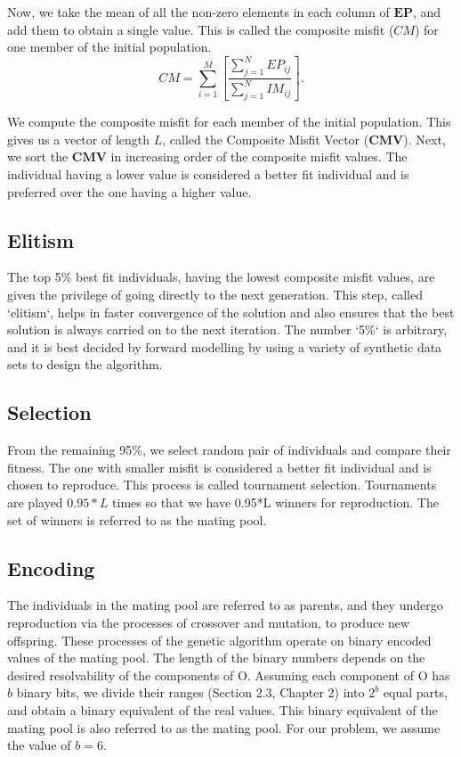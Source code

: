 Now, we take the mean of all the non-zero elements in each column of $\bm{EP}$, and add them to obtain a single value. This is called the composite misfit ($CM$) for one member of the initial population.
\begin{equation} \label{23}
CM = \displaystyle \sum_{i=1}^{M}\left[ \frac{\displaystyle \sum_{j=1}^{N}EP_{ij}}{\displaystyle \sum_{j=1}^{N}IM_{ij}}\right].
\end{equation}

We compute the composite misfit for each member of the initial population. This gives us a vector of length $L$, called the Composite Misfit Vector ($\bm{CMV}$). Next, we sort the $\bm{CMV}$ in increasing order of the composite misfit values. The individual having a lower value is considered a better fit individual and is preferred over the one having a higher value.

\subsection{Elitism}
The top 5\% best fit individuals, having the lowest composite misfit values, are given the privilege of going directly to the next generation. This step, called `elitism`, helps in faster convergence of the solution and also ensures that the best solution is always carried on to the next iteration. The number `5\%` is arbitrary, and it is best decided by forward modelling by using a variety of synthetic data sets to design the algorithm.

\subsection{Selection}
From the remaining 95\%, we select random pair of individuals and compare their fitness. The one with smaller misfit is considered a better fit individual and is chosen to reproduce. This process is called tournament selection. Tournaments are played $0.95*L$ times so that we have 0.95*L winners for reproduction. The set of winners is referred to as the mating pool.

\subsection{Encoding}
The individuals in the mating pool are referred to as parents, and they undergo reproduction via the processes of crossover and mutation, to produce new offspring. These processes of the genetic algorithm operate on binary encoded values of the mating pool. The length of the binary numbers depends on the desired resolvability of the components of O. Assuming each component of O has $b$ binary bits, we divide their ranges (Section 2.3, Chapter 2) into $2^b$ equal parts, and obtain a binary equivalent of the real values. This binary equivalent of the mating pool is also referred to as the mating pool. For our problem, we assume the value of $b = 6$.

